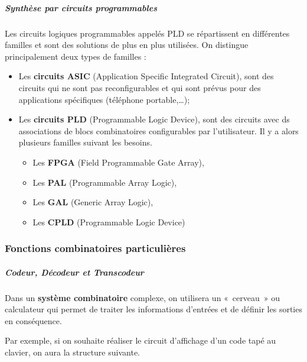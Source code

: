 \hypertarget{synthuxe8se-par-circuits-programmables}{%
\subparagraph*{Synthèse par circuits programmables}\label{synthuxe8se-par-circuits-programmables}}

Les circuits logiques programmables appelés PLD se répartissent en différentes familles et sont des solutions de plus en plus utilisées. On distingue principalement deux types de familles :

\begin{itemize}
\item
  Les \textbf{circuits ASIC} (Application Specific Integrated Circuit), sont des circuits qui ne sont pas reconfigurables et qui sont prévus pour des applications spécifiques (téléphone portable,\ldots);
\item
  Les \textbf{circuits PLD} (Programmable Logic Device), sont des circuits avec ds associations de blocs combinatoires configurables par l'utilisateur. Il y a alors plusieurs familles suivant les besoins.

  \begin{itemize}
  \item
    Les \textbf{FPGA} (Field Programmable Gate Array),
  \item
    Les \textbf{PAL} (Programmable Array Logic),
  \item
    Les \textbf{GAL} (Generic Array Logic),
  \item
    Les \textbf{CPLD} (Programmable Logic Device)
  \end{itemize}
\end{itemize}

\hypertarget{fonctions-combinatoires-particuliuxe8res}{%
\subsubsection{Fonctions combinatoires particulières}\label{fonctions-combinatoires-particuliuxe8res}}

\hypertarget{codeur-duxe9codeur-et-transcodeur}{%
\subparagraph*{Codeur, Décodeur et Transcodeur}\label{codeur-duxe9codeur-et-transcodeur}}

Dans un \textbf{système combinatoire} complexe, on utilisera un «~cerveau~» ou calculateur qui permet de traiter les informations d'entrées et de définir les sorties en conséquence.

Par exemple, si on souhaite réaliser le circuit d'affichage d'un code tapé au clavier, on aura la structure suivante.

